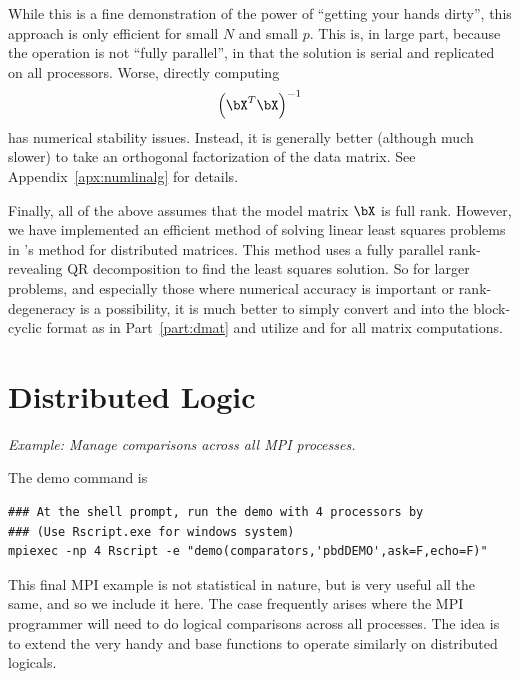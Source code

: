 While this is a fine demonstration of the power of ``getting your hands dirty'', this approach is only efficient for small $N$ and small $p$.  This is, in large part, because the operation is not ``fully parallel'', in that the solution is serial and replicated on all processors.  Worse, directly computing
\begin{align*}
\left(\bX^T\bX\right)^{-1}
\end{align*}
has numerical stability issues.  Instead, it is generally better (although much slower) to take an orthogonal factorization of the data matrix.  See Appendix~\ref{apx:numlinalg} for details.

Finally, all of the above assumes that the model matrix $\bX$ is full rank.  However, we have implemented an efficient method of solving linear least squares problems in 's  method for distributed matrices.  This method uses a fully parallel rank-revealing QR decomposition to find the least squares solution.  So for larger problems, and especially those where numerical accuracy is important or rank-degeneracy is a possibility, it is much better to simply convert  and  into the block-cyclic format as in Part~\ref{part:dmat} and utilize  and  for all matrix computations.








\section{Distributed Logic}%

\emph{Example:  Manage comparisons across all MPI processes.}

The demo command is
\begin{lstlisting}
### At the shell prompt, run the demo with 4 processors by
### (Use Rscript.exe for windows system)
mpiexec -np 4 Rscript -e "demo(comparators,'pbdDEMO',ask=F,echo=F)"
\end{lstlisting}

This final MPI example is not statistical in nature, but is very useful all the same, and so we include it here.  The case frequently arises where the MPI programmer will need to do logical comparisons across all processes.  The idea is to extend the very handy  and  base  functions to operate similarly on distributed logicals.

